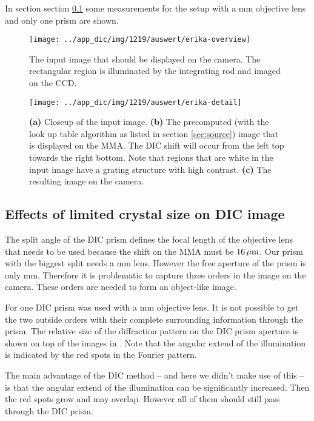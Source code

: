 In section section \ref{sec:size} some measurements for the setup with a
\unit[200]{mm} objective lens and only one prism are shown.
\begin{figure}[p]
  \centering
  \texttt{[image: ../app\_dic/img/1219/auswert/erika-overview]}
  \caption{The input image that should be displayed on the camera. The
    rectangular region is illuminated by the integrating rod and
    imaged on the CCD.}
  \label{fig:erika-overview}
\end{figure}

\begin{figure}[p]
  \centering
  \texttt{[image: ../app\_dic/img/1219/auswert/erika-detail]}
  \caption{{\bf (a)} Closeup of the input image. {\bf (b)} The
    precomputed (with the look up table algorithm as listed in section
    \ref{sec:source}) image that is displayed on the MMA. The DIC
    shift will occur from the left top towards the right bottom. Note
    that regions that are white in the input image have a grating
    structure with high contrast. {\bf (c)} The resulting image on the
    camera.}
  \label{fig:erika-detail}
\end{figure}
\newpage
\subsection{Effects of limited crystal size on DIC image}
\label{sec:size}
The split angle of the DIC prism defines the focal length of the
objective lens that needs to be used because the shift on the MMA must
be $\unit[16]{\mu m}$. Our prism with the biggest split needs a
\unit[200]{mm} lens. However the free aperture of the prism is only
\unit[10]{mm}. Therefore it is problematic to capture three orders in
the image on the camera. These orders are needed to form an
object-like image.

For  one DIC prism was used with a \unit[200]{mm}
objective lens. It is not possible to get the two outside orders with
their complete surrounding information through the prism. The relative
size of the diffraction pattern on the DIC prism aperture is shown on
top of the images in . Note that the angular extend
of the illumination is indicated by the red spots in the Fourier
pattern.

The main advantage of the DIC method -- and here we didn't make use of
this -- is that the angular extend of the illumination can be
significantly increased. Then the red spots grow and may
overlap. However all of them should still pass through the DIC prism.

